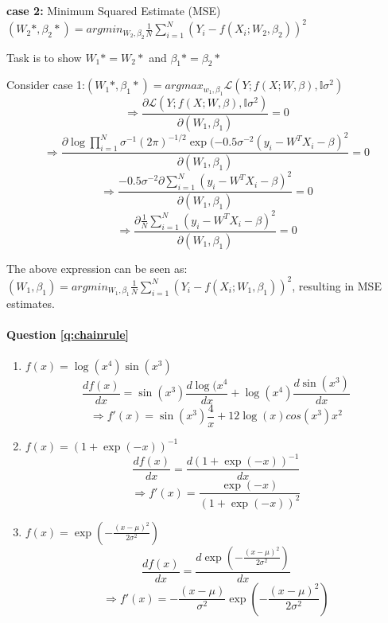 \textbf{case 2:} Minimum Squared Estimate (MSE)
$(W_2*, \beta_2*) = argmin_{W_2, \beta_2} \frac{1}{N}\sum_{i=1}^N(Y_i - f(X_i; W_2, \beta_2))^2$

Task is to show $W_1* = W_2*$ and $\beta_1* = \beta_2*$

Consider case 1:$(W_1*, \beta_1*) = argmax_{w_1, \beta_1} \mathcal{L}(Y; f(X; W, \beta), \mathbb{I}\sigma^2)$
$$ \Rightarrow \frac{\partial \mathcal{L}(Y; f(X; W, \beta), \mathbb{I}\sigma^2)}{\partial (W_1, \beta_1)} = 0 $$
$$ \Rightarrow \frac{\partial \log \prod_{i=1}^N \sigma^{-1}(2\pi)^{-1/2} \exp(-0.5\sigma^{-2}(y_i - W^TX_i - \beta)^2}{\partial (W_1, \beta_1)} = 0 $$
$$ \Rightarrow \frac{-0.5\sigma^{-2}\partial \sum_{i=1}^N (y_i - W^TX_i - \beta)^2}{\partial (W_1, \beta_1)} = 0 $$
$$ \Rightarrow \frac{\partial \frac{1}{N}\sum_{i=1}^N (y_i - W^TX_i - \beta)^2}{\partial (W_1, \beta_1)} = 0 $$

The above expression can be seen as: $(W_1, \beta_1) = argmin_{W_1, \beta_1} \frac{1}{N}\sum_{i=1}^N(Y_i - f(X_i; W_1, \beta_1))^2$, resulting in MSE estimates.




\paragraph{Question \ref{q:chainrule}}
\begin{enumerate}[label=\alph*.]
\item $f(x) = \log (x^4) \sin (x^3)$
        $$\frac{d f(x)}{dx} = \sin(x^3) \frac{d \log(x^4}{dx} + \log (x^4)\frac{d \sin(x^3)}{dx}$$
        $$\Rightarrow f'(x) = \sin(x^3)\frac{4}{x} + 12\log(x)cos(x^3)x^2$$
        
\item $f(x) = (1 + \exp(-x))^{-1}$
         $$\frac{d f(x)}{dx} = \frac{d (1 + \exp(-x))^{-1}}{dx}$$
         $$\Rightarrow f'(x) = \frac{\exp(-x)}{(1 + \exp(-x))^2}$$
        
\item $f(x) = \exp\left(-\frac{(x-\mu)^2}{2\sigma^2}\right)$
         $$\frac{d f(x)}{dx} = \frac{d \exp\left(-\frac{(x-\mu)^2}{2\sigma^2}\right)}{dx}$$
         $$\Rightarrow f'(x) = -\frac{(x-\mu)}{\sigma^2}\exp\left(-\frac{(x-\mu)^2}{2\sigma^2}\right)$$

\end{enumerate}
